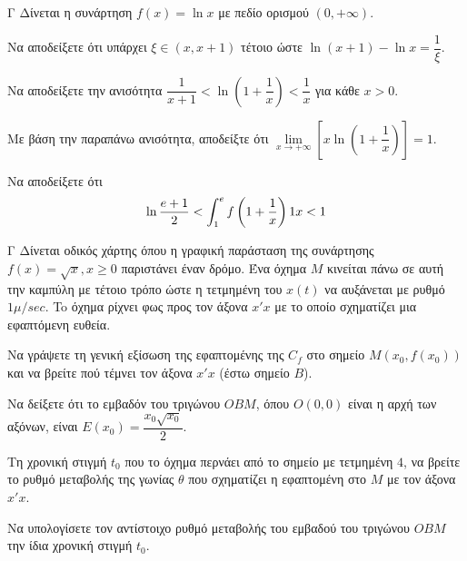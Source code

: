 \begin{thema}{Γ}
Δίνεται η συνάρτηση $f(x) = \ln x$ με πεδίο ορισμού $(0, +\infty)$.
\begin{erwthma}
\item Να αποδείξετε ότι υπάρχει $\xi \in (x, x+1)$ τέτοιο ώστε $\ln(x+1) - \ln x = \dfrac{1}{\xi}$.
\item Να αποδείξετε την ανισότητα $\dfrac{1}{x+1} < \ln\left(1 + \dfrac{1}{x}\right) < \dfrac{1}{x}$ για κάθε $x > 0$.
\item Με βάση την παραπάνω ανισότητα, αποδείξτε ότι $\lim\limits_{x \to +\infty} \left[x \ln\left(1 + \dfrac{1}{x}\right)\right] = 1$.
\item Να αποδείξετε ότι \[\ln{\frac{e+1}{2}}<\int_{1}^{e}{f\left(1+\frac{1}{x}\right)1 x}<1\]
\end{erwthma}
\end{thema}

\begin{thema}{Γ}
Δίνεται οδικός χάρτης όπου η γραφική παράσταση της συνάρτησης $f(x) = \sqrt{x}, x \ge 0$ παριστάνει έναν δρόμο. Ένα όχημα $M$ κινείται πάνω σε αυτή την καμπύλη με τέτοιο τρόπο ώστε η τετμημένη του $x(t)$ να αυξάνεται με ρυθμό $1 \mu/\si{sec}$. To όχημα ρίχνει φως προς τον άξονα $x'x$ με το οποίο σχηματίζει μια εφαπτόμενη ευθεία.
\begin{erwthma}
  \item Να γράψετε τη γενική εξίσωση της εφαπτομένης της $C_f$ στο σημείο $M(x_0, f(x_0))$ και να βρείτε πού τέμνει τον άξονα $x'x$ (έστω σημείο $B$).
  \item Να δείξετε ότι το εμβαδόν του τριγώνου $O B M$, όπου $O(0,0)$ είναι η αρχή των αξόνων, είναι $E(x_0) = \dfrac{x_0\sqrt{x_0}}{2}$.
  \item Τη χρονική στιγμή $t_0$ που το όχημα περνάει από το σημείο με τετμημένη $4$, να βρείτε το ρυθμό μεταβολής της γωνίας $\theta$ που σχηματίζει η εφαπτομένη στο $M$ με τον άξονα $x'x$.
  \item Να υπολογίσετε τον αντίστοιχο ρυθμό μεταβολής του εμβαδού του τριγώνου $O B M$ την ίδια χρονική στιγμή $t_0$.
\end{erwthma}
\end{thema}

